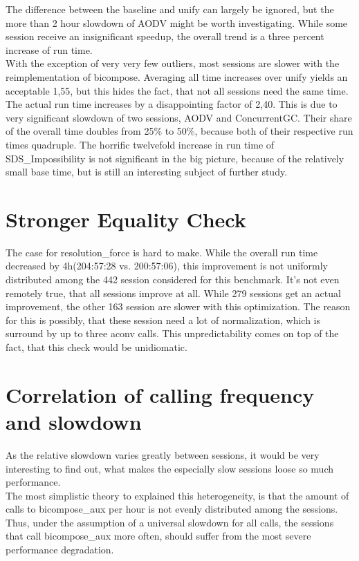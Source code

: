 The difference between the baseline and unify can largely be ignored, but the more than 2 hour slowdown of AODV might be worth investigating. While some session receive an insignificant speedup, the overall trend is a three percent increase of run time.\\
With the exception of very very few outliers, most sessions are slower with the reimplementation of bicompose. Averaging all time increases over unify yields an acceptable 1,55, but this hides the fact, that not all sessions need the same time. The actual run time increases by a disappointing factor of 2,40. This is due to very significant slowdown of two sessions, AODV and ConcurrentGC. Their share of the overall time doubles from 25\% to 50\%, because both of their respective run times quadruple. The horrific twelvefold increase in run time of SDS\_Impossibility is not significant in the big picture, because of the relatively small base time, but is still an interesting subject of further study.

\section{Stronger Equality Check}

The case for resolution\_force is hard to make. While the overall run time decreased by 4h(204:57:28 vs. 200:57:06), this improvement is not uniformly distributed among the 442 session considered for this benchmark. It's not even remotely true, that all sessions improve at all. While 279 sessions get an actual improvement, the other 163 session are slower with this optimization. The reason for this is possibly, that these session need a lot of normalization, which is surround by up to three aconv calls. This unpredictability comes on top of the fact, that this check would be unidiomatic.

\section{Correlation of calling frequency and slowdown}

As the relative slowdown varies greatly between sessions, it would be very interesting to find out, what makes the especially slow sessions loose so much performance.\\
The most simplistic theory to explained this heterogeneity, is that the amount of calls to bicompose\_aux per hour is not evenly distributed among the sessions. Thus, under the assumption of a universal slowdown for all calls, the sessions that call bicompose\_aux more often, should suffer from the most severe performance degradation.

